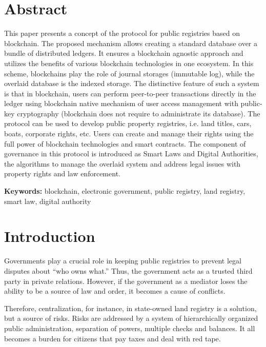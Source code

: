 \begin{multicols}{2}

\section*{Abstract} 

This paper presents a concept of the protocol for public registries based on blockchain. The proposed mechanism allows creating a standard database over a bundle of distributed ledgers. It ensures a blockchain agnostic approach and utilizes the benefits of various blockchain technologies in one ecosystem. In this scheme, blockchains play the role of journal storages (immutable log), while the overlaid database is the indexed storage. The distinctive feature of such a system is that in blockchain, users can perform peer-to-peer transactions directly in the ledger using blockchain native mechanism of user access management with public-key cryptography (blockchain does not require to administrate its database). The protocol can be used to develop public property registries, i.e. land titles, cars, boats, corporate rights, etc. Users can create and manage their rights using the full power of blockchain technologies and smart contracts. The component of governance in this protocol is introduced as Smart Laws and Digital Authorities, the algorithms to manage the overlaid system and address legal issues with property rights and law enforcement.

\textbf{Keywords:} blockchain, electronic government, public registry, land registry, smart law, digital authority

\section{Introduction}\label{sec-01}
 
Governments play a crucial role in keeping public registries to prevent legal disputes about “who owns what.” Thus, the government acts as a trusted third party in private relations. However, if the government as a mediator loses the ability to be a source of law and order, it becomes a cause of conflicts.

Therefore, centralization, for instance, in state-owned land registry is a solution, but a source of risks. Risks are addressed by a system of hierarchically organized public administration, separation of powers, multiple checks and balances. It all becomes a burden for citizens that pay taxes and deal with red tape.


\end{multicols}
